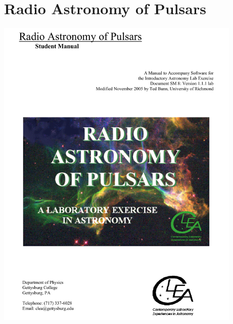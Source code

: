 \section{Radio Astronomy of Pulsars}

\makelabheader

\includegraphics[height=6in,trim=-1in -3in 0 0]{pulsars/pulsar1.pdf}
\vfil\eject

